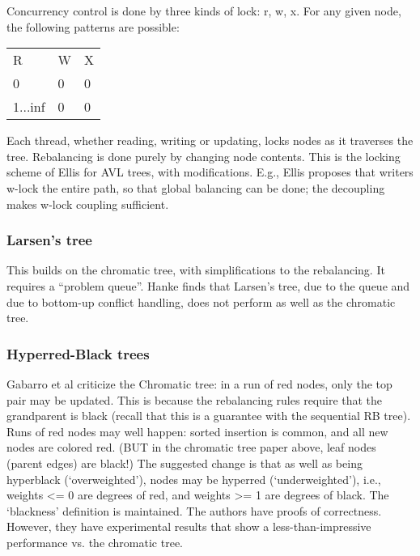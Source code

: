 Concurrency control is done by three kinds of lock: r, w, x.
For any given node, the following patterns are possible:

\begin{tabular}{lll}
R       & W & X \\
0       & 0 & 0 \\
1...inf & 0 & 0 \\

\end{tabular}

Each thread, whether reading, writing or updating,
  locks nodes as it traverses the tree.
Rebalancing is done purely by changing node contents.
This is the locking scheme of Ellis for AVL trees\cite{ellis},
  with modifications.
E.g., Ellis proposes that writers w-lock the entire path,
  so that global balancing can be done;
  the decoupling makes w-lock coupling sufficient.


\subsubsection{Larsen's tree\cite{larsen}}

This builds on the chromatic tree,
  with simplifications to the rebalancing.
It requires a \enquote{problem queue}.
Hanke finds that Larsen’s tree,
  due to the queue and due to bottom-up conflict handling,
  does not perform as well as the chromatic tree.


\subsubsection{Hyperred-Black trees}

Gabarro et al criticize the Chromatic tree:
  in a run of red nodes, only the top pair may be updated.
This is because the rebalancing rules require that
  the grandparent is black (recall that this is a guarantee with the sequential RB tree).
Runs of red nodes may well happen:
  sorted insertion is common,
  and all new nodes are colored red.
(BUT in the chromatic tree paper above, leaf nodes (parent edges) are black!)
The suggested change is that
  as well as being hyperblack (‘overweighted’),
  nodes may be hyperred (‘underweighted’),
  i.e., weights <= 0 are degrees of red,
  and weights >= 1 are degrees of black.
The ‘blackness’ definition is maintained.
The authors have proofs of correctness.
However, they have experimental results
  that show a less-than-impressive performance vs. the chromatic tree.
